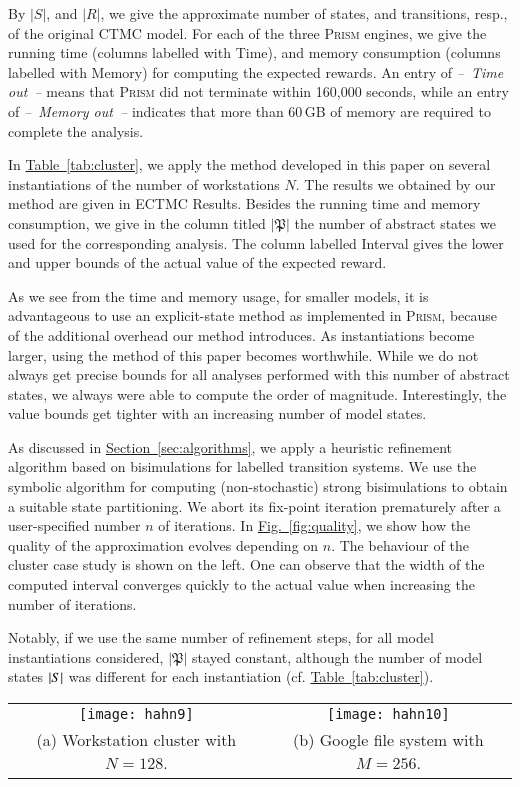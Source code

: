 \documentclass[10pt,twocolumn]{article}
\newcommand{\PRISM}{\textsc{Prism}\xspace}
\newcommand{\states} {{\ensuremath S}}
\newcommand{\timelimit}{\emph{--~Time out~--}}
\newcommand{\memlimit}{\emph{--~Memory out~--}}
\newcommand{\apart}{\mathfrak{P}}
\newcommand{\refsec}[1]{\texorpdfstring{\hyperref[sec:#1]{Section~\ref*{sec:#1}}}{Section~\ref*{sec:#1}}}
\newcommand{\reffig}[1]{\texorpdfstring{\hyperref[fig:#1]{Fig.~\ref*{fig:#1}}}{Fig.~\ref*{fig:#1}}}
\newcommand{\reftab}[1]{\texorpdfstring{\hyperref[tab:#1]{Table~\ref*{tab:#1}}}{Table~\ref*{tab:#1}}}
\begin{document}
By $|S|$, and $|R|$, we give the approximate number of states, and
transitions, resp., of the original CTMC model. For each of the three
\PRISM engines, we give the running time (columns labelled with Time), and 
memory consumption (columns labelled with Memory) for computing
the expected rewards. An entry of \timelimit{} means that \PRISM did 
not terminate within 160,000 seconds, while an entry of \memlimit{} indicates that 
more than 60\,GB of memory are required to complete the analysis.

In \reftab{cluster}, we apply the method developed in this
paper on several instantiations of the number of workstations $N$.  
The results we obtained by our method are given in ECTMC Results.
Besides the running time and memory consumption, we give in the column
titled $|\apart|$ the number of abstract states we used for the corresponding analysis.
The column labelled Interval gives the lower and upper bounds of the actual value of the expected reward.

As we see from the time and memory usage, for smaller models, it is
advantageous to use an explicit-state method as implemented in \PRISM,
because of the additional overhead our method introduces. As
instantiations become larger, using the method of this paper becomes
worthwhile. While we do not always get precise bounds for all
analyses performed with this number of abstract states, we always were
able to compute the order of magnitude. Interestingly, the value
bounds get tighter with an increasing number of model states.

As discussed in \refsec{algorithms}, we apply a heuristic refinement algorithm based on bisimulations for labelled transition systems.
We use the symbolic algorithm \cite{wimmer-et-al-atva-2006} for computing (non-stochastic) strong bisimulations to obtain a suitable state partitioning.
We abort its fix-point iteration prematurely after a user-specified number $n$ of iterations.
In \reffig{quality}, we show how the quality of the
approximation evolves depending on $n$. The behaviour of the cluster
case study is shown on the left. One can observe that the
width of the computed interval converges quickly to the actual value
when increasing the number of iterations. 


Notably, if we use the same number of refinement steps, for all model instantiations
considered, $|\apart|$ stayed constant, although the number of model
states $|\states|$ was different for each instantiation (cf. \reftab{cluster}).
\begin{figure*}[tb]
  \centering
  \begin{tabular}{cc}
  \texttt{[image: hahn9]} & \texttt{[image: hahn10]} \\
  \footnotesize (a) Workstation cluster with $N=128$. & \footnotesize (b) Google file system with $M=256$.
  \end{tabular}
  \caption{Quality of the ECTMC approximation for different numbers of bisimulation iterations.}
  \label{fig:quality}
\end{figure*}
\end{document}

